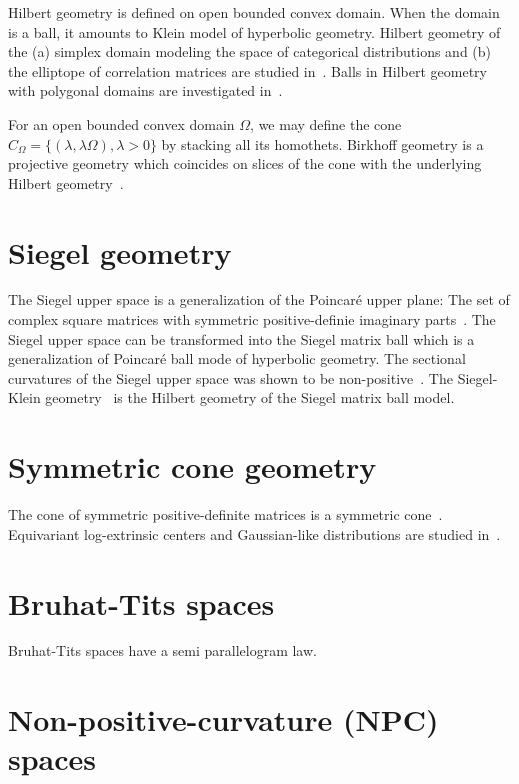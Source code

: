 \documentclass[11pt]{article}
\begin{document}
Hilbert geometry is defined on open bounded convex domain. When the domain is a ball, it amounts to Klein model of hyperbolic geometry.
Hilbert geometry of the (a) simplex domain modeling the space of categorical distributions and (b) the elliptope of correlation matrices are studied in~\cite{nielsen2019clustering,nielsen2023non}. 
Balls in Hilbert geometry with polygonal domains are investigated in~\cite{nielsen2017balls}.

For an open bounded convex domain $\Omega$, we may define the cone $C_\Omega=\{(\lambda,\lambda\Omega), \lambda>0\}$ by stacking all its homothets. Birkhoff geometry is a projective geometry which coincides on slices of the cone with the underlying Hilbert geometry~\cite{nielsen2023fisher}.


 
\section*{Siegel geometry}

The Siegel upper space is a generalization of the Poincar\'e upper plane: The set of complex square matrices with symmetric positive-definie imaginary parts~\cite{nielsen2013matrix}. The Siegel upper space can be transformed into the Siegel matrix ball which is a generalization of Poincar\'e ball mode of hyperbolic geometry.
The sectional curvatures of the Siegel upper space was shown to be non-positive~\cite{cabanes2021classification}.
The Siegel-Klein geometry~\cite{nielsen2020siegel} is the Hilbert geometry of the Siegel matrix ball model.

\section*{Symmetric cone geometry}

The cone of symmetric positive-definite matrices is a symmetric cone~\cite{nielsen2023fisher}.
Equivariant log-extrinsic centers and Gaussian-like distributions are studied in~\cite{chevallier2024equivariant}.


\section*{Bruhat-Tits spaces}

Bruhat-Tits spaces have a semi parallelogram law.



\section*{Non-positive-curvature (NPC) spaces}
\end{document}
